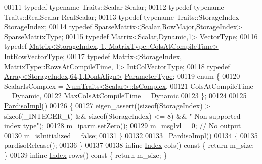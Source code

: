 \begin{DoxyCode}
00111     \textcolor{keyword}{typedef} \textcolor{keyword}{typename} Traits::Scalar Scalar;
00112     \textcolor{keyword}{typedef} \textcolor{keyword}{typename} Traits::RealScalar RealScalar;
00113     \textcolor{keyword}{typedef} \textcolor{keyword}{typename} Traits::StorageIndex StorageIndex;
00114     \textcolor{keyword}{typedef} \hyperlink{group___sparse_core___module}{SparseMatrix<Scalar,RowMajor,StorageIndex>} 
      \hyperlink{group___sparse_core___module}{SparseMatrixType};
00115     \textcolor{keyword}{typedef} \hyperlink{group___core___module}{Matrix<Scalar,Dynamic,1>} \hyperlink{group___core___module}{VectorType};
00116     \textcolor{keyword}{typedef} \hyperlink{group___core___module_class_eigen_1_1_matrix}{Matrix<StorageIndex, 1, MatrixType::ColsAtCompileTime>}
       \hyperlink{group___core___module_class_eigen_1_1_matrix}{IntRowVectorType};
00117     \textcolor{keyword}{typedef} \hyperlink{group___core___module}{Matrix<StorageIndex, MatrixType::RowsAtCompileTime, 1>}
       \hyperlink{group___core___module}{IntColVectorType};
00118     \textcolor{keyword}{typedef} \hyperlink{group___core___module}{Array<StorageIndex,64,1,DontAlign>} 
      \hyperlink{group___core___module}{ParameterType};
00119     \textcolor{keyword}{enum} \{
00120       ScalarIsComplex = \hyperlink{group___core___module_struct_eigen_1_1_num_traits}{NumTraits<Scalar>::IsComplex},
00121       ColsAtCompileTime = \hyperlink{namespace_eigen_ad81fa7195215a0ce30017dfac309f0b2}{Dynamic},
00122       MaxColsAtCompileTime = \hyperlink{namespace_eigen_ad81fa7195215a0ce30017dfac309f0b2}{Dynamic}
00123     \};
00124 
00125     \hyperlink{class_eigen_1_1_pardiso_impl}{PardisoImpl}()
00126     \{
00127       eigen\_assert((\textcolor{keyword}{sizeof}(StorageIndex) >= \textcolor{keyword}{sizeof}(\_INTEGER\_t) && \textcolor{keyword}{sizeof}(StorageIndex) <= 8) && \textcolor{stringliteral}{"
      Non-supported index type"});
00128       m\_iparm.setZero();
00129       m\_msglvl = 0; \textcolor{comment}{// No output}
00130       m\_isInitialized = \textcolor{keyword}{false};
00131     \}
00132 
00133     ~\hyperlink{class_eigen_1_1_pardiso_impl}{PardisoImpl}()
00134     \{
00135       pardisoRelease();
00136     \}
00137 
00138     \textcolor{keyword}{inline} \hyperlink{namespace_eigen_a62e77e0933482dafde8fe197d9a2cfde}{Index} cols()\textcolor{keyword}{ const }\{ \textcolor{keywordflow}{return} m\_size; \}
00139     \textcolor{keyword}{inline} \hyperlink{namespace_eigen_a62e77e0933482dafde8fe197d9a2cfde}{Index} rows()\textcolor{keyword}{ const }\{ \textcolor{keywordflow}{return} m\_size; \}

\end{DoxyCode}
